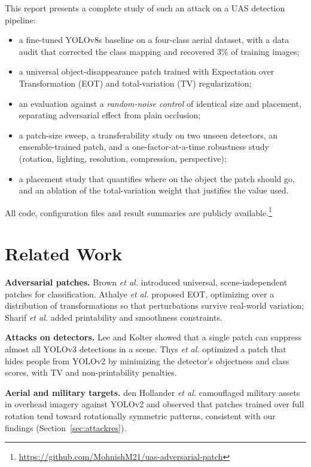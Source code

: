 \documentclass[conference]{IEEEtran}
\begin{document}
This report presents a complete study of such an attack on a UAS detection pipeline:
\begin{itemize}
\item a fine-tuned YOLOv8s baseline on a four-class aerial dataset, with a data audit that
corrected the class mapping and recovered 3\% of training images;
\item a universal object-disappearance patch trained with Expectation over Transformation
(EOT) \cite{athalye2018synthesizing} and total-variation (TV) regularization;
\item an evaluation against a \emph{random-noise control} of identical size and placement,
separating adversarial effect from plain occlusion;
\item a patch-size sweep, a transferability study on two unseen detectors, an ensemble-trained
patch, and a one-factor-at-a-time robustness study (rotation, lighting, resolution,
compression, perspective);
\item a placement study that quantifies where on the object the patch should go, and an
ablation of the total-variation weight that justifies the value used.
\end{itemize}
All code, configuration files and result summaries are publicly available.\footnote{\url{https://github.com/MohnishM21/uas-adversarial-patch}}

\section{Related Work}
\textbf{Adversarial patches.} Brown \emph{et al.} \cite{brown2017adversarial} introduced
universal, scene-independent patches for classification. Athalye \emph{et al.}
\cite{athalye2018synthesizing} proposed EOT, optimizing over a distribution of
transformations so that perturbations survive real-world variation; Sharif \emph{et al.}
\cite{sharif2016accessorize} added printability and smoothness constraints.

\textbf{Attacks on detectors.} Lee and Kolter \cite{lee2019physical} showed that a single
patch can suppress almost all YOLOv3 detections in a scene. Thys \emph{et al.}
\cite{thys2019fooling} optimized a patch that hides people from YOLOv2 by minimizing the
detector's objectness and class scores, with TV and non-printability penalties.

\textbf{Aerial and military targets.} den Hollander \emph{et al.}
\cite{denhollander2020adversarial} camouflaged military assets in overhead imagery against
YOLOv2 and observed that patches trained over full rotation tend toward rotationally symmetric
patterns, consistent with our findings (Section~\ref{sec:attackres}).
\end{document}
